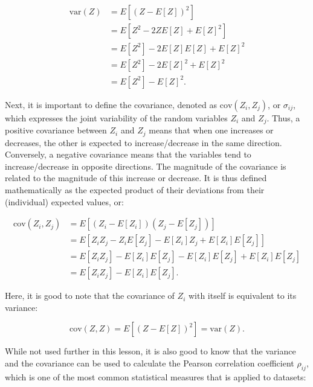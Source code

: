 \begin{align}
\mathrm{var}(Z) &= E\left[{\left(Z-E\left[Z\right]\right)}^2\right] \label{eq:variance1} \\
&= E\left[Z^2 -2ZE\left[Z\right] + E[Z]^2\right] \nonumber \\
&= E\left[Z^2\right] - 2E\left[Z\right]E\left[Z\right] + E\left[Z\right]^2 \nonumber \\
&= E\left[Z^2\right] - 2E\left[Z\right]^2 + E\left[Z\right]^2 \nonumber \\
&= E\left[Z^2\right]-{E[Z]}^2. \label{eq:variance2}
\end{align}

Next, it is important to define the covariance, denoted as \(\mathrm{cov}(Z_i,Z_j)\), or \(\sigma_{ij}\), which expresses the joint variability of the random variables \(Z_i\) and \(Z_j\).
Thus, a positive covariance between \(Z_i\) and \(Z_j\) means that when one increases or decreases, the other is expected to increase/decrease in the same direction.
Conversely, a negative covariance means that the variables tend to increase/decrease in opposite directions.
The magnitude of the covariance is related to the magnitude of this increase or decrease.
It is thus defined mathematically as the expected product of their deviations from their (individual) expected values, or:

\begin{align}
\mathrm{cov}(Z_i, Z_j) &= E\left[\left(Z_i-E[Z_i]\right) \left(Z_j-E[Z_j]\right)\right] \label{eq:covariance} \\
&= E\left[Z_iZ_j - Z_iE\left[Z_j\right] - E\left[Z_i\right]Z_j + E\left[Z_i\right]E\left[Z_j\right]\right] \nonumber \\
&= E\left[Z_iZ_j\right] - E\left[Z_i\right]E\left[Z_j\right] - E\left[Z_i\right]E\left[Z_j\right] + E\left[Z_i\right]E\left[Z_j\right] \nonumber \\
&= E\left[Z_iZ_j\right] - E\left[Z_i\right]E\left[Z_j\right]. \label{eq:covariance2}
\end{align}

Here, it is good to note that the covariance of \(Z_i\) with itself is equivalent to its variance:

\begin{equation}
\mathrm{cov}(Z,Z) = E\left[\left(Z-E[Z]\right)^2\right] = \mathrm{var}(Z). \nonumber
\end{equation}

While not used further in this lesson, it is also good to know that the variance and the covariance can be used to calculate the Pearson correlation coefficient \(\rho_{ij}\), which is one of the most common statistical measures that is applied to datasets:

